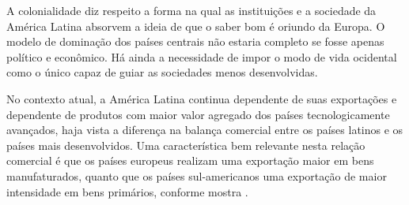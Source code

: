 A colonialidade diz respeito a forma na qual as instituições e a sociedade da América Latina absorvem a ideia de que o saber bom é oriundo da Europa. O modelo de dominação dos países centrais não estaria completo se fosse apenas político e econômico. Há ainda a necessidade de impor o modo de vida ocidental como o único capaz de guiar as sociedades menos desenvolvidas.

No contexto atual, a América Latina continua dependente de suas exportações e dependente de produtos com maior valor agregado dos países tecnologicamente avançados, haja vista a diferença na balança comercial entre os países latinos e os países mais desenvolvidos. Uma característica bem relevante nesta relação comercial é que os países europeus realizam uma exportação maior em bens manufaturados, quanto que os países sul-americanos uma exportação de maior intensidade em bens primários, conforme mostra \cite{serra2013}.

